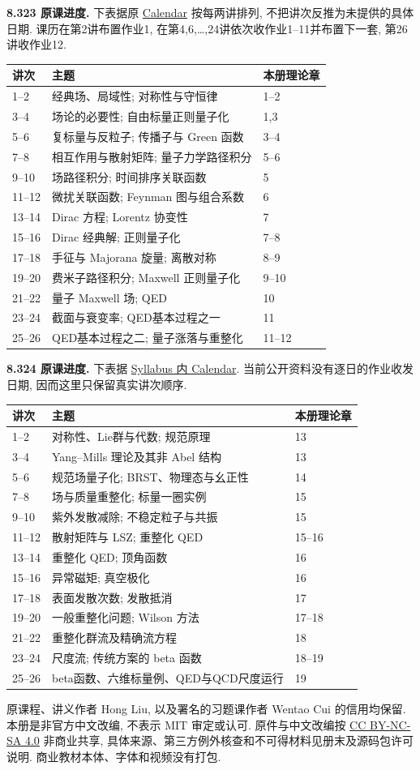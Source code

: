 \noindent\textbf{8.323 原课进度.} 下表据原 \href{https://ocw.mit.edu/courses/8-323-relativistic-quantum-field-theory-i-spring-2023/pages/calendar/}{Calendar} 按每两讲排列, 不把讲次反推为未提供的具体日期. 课历在第2讲布置作业1, 在第4,6,\ldots,24讲依次收作业1--11并布置下一套, 第26讲收作业12.
\begin{longtable}{@{}p{.10\linewidth}p{.71\linewidth}p{.13\linewidth}@{}}
\toprule 讲次&主题&本册理论章\\\midrule\endhead
1--2&经典场、局域性; 对称性与守恒律&1--2\\
3--4&场论的必要性; 自由标量正则量子化&1,3\\
5--6&复标量与反粒子; 传播子与 Green 函数&3--4\\
7--8&相互作用与散射矩阵; 量子力学路径积分&5--6\\
9--10&场路径积分; 时间排序关联函数&5\\
11--12&微扰关联函数; Feynman 图与组合系数&6\\
13--14&Dirac 方程; Lorentz 协变性&7\\
15--16&Dirac 经典解; 正则量子化&7--8\\
17--18&手征与 Majorana 旋量; 离散对称&8--9\\
19--20&费米子路径积分; Maxwell 正则量子化&9--10\\
21--22&量子 Maxwell 场; QED&10\\
23--24&截面与衰变率; QED基本过程之一&11\\
25--26&QED基本过程之二; 量子涨落与重整化&11--12\\\bottomrule
\end{longtable}

\noindent\textbf{8.324 原课进度.} 下表据 \href{https://ocw.mit.edu/courses/8-324-relativistic-quantum-field-theory-ii-fall-2010/pages/syllabus/}{Syllabus 内 Calendar}. 当前公开资料没有逐日的作业收发日期, 因而这里只保留真实讲次顺序.
\begin{longtable}{@{}p{.10\linewidth}p{.71\linewidth}p{.13\linewidth}@{}}
\toprule 讲次&主题&本册理论章\\\midrule\endhead
1--2&对称性、Lie群与代数; 规范原理&13\\
3--4&Yang--Mills 理论及其非 Abel 结构&13\\
5--6&规范场量子化; BRST、物理态与幺正性&14\\
7--8&场与质量重整化; 标量一圈实例&15\\
9--10&紫外发散减除; 不稳定粒子与共振&15\\
11--12&散射矩阵与 LSZ; 重整化 QED&15--16\\
13--14&重整化 QED; 顶角函数&16\\
15--16&异常磁矩; 真空极化&16\\
17--18&表面发散次数; 发散抵消&17\\
19--20&一般重整化问题; Wilson 方法&17--18\\
21--22&重整化群流及精确流方程&18\\
23--24&尺度流; 传统方案的 beta 函数&18--19\\
25--26&beta函数、六维标量例、QED与QCD尺度运行&19\\\bottomrule
\end{longtable}

原课程、讲义作者 Hong Liu, 以及署名的习题课作者 Wentao Cui 的信用均保留. 本册是非官方中文改编, 不表示 MIT 审定或认可. 原件与中文改编按 \href{https://creativecommons.org/licenses/by-nc-sa/4.0/}{CC BY-NC-SA 4.0} 非商业共享, 具体来源、第三方例外核查和不可得材料见册末及源码包许可说明. 商业教材本体、字体和视频没有打包.
